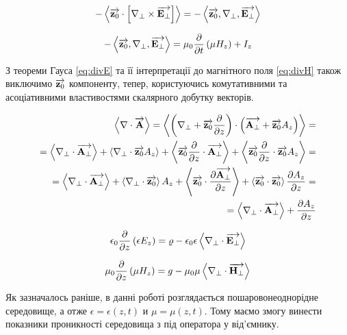 \textcolor{lightgray}{ \begin{equation*} \begin{aligned}
- \left< \overrightarrow{\mathbf z_0} \cdot \left[ \nabla_\perp \times \overrightarrow{\mathbf E_\perp} \right] \right> = 
- \left< \overrightarrow{\mathbf z_0} , \nabla_\perp , \overrightarrow{\mathbf E_\perp} \right>
\end{aligned} \end{equation*} }

\begin{equation} \label{eq:rotEz}
- \left< \overrightarrow{\mathbf z_0} , \nabla_\perp , \overrightarrow{\mathbf E_\perp} \right> =
\mu_0 \frac{\partial }{\partial t} \left(\mu H_z \right) + I_z
\end{equation}

З теореми Гауса \eqref{eq:divE} та її інтерпретації до магнітного поля 
\eqref{eq:divH} також виключимо $ \overrightarrow{\mathbf z_0} $ компоненту, тепер, користуючись 
комутативними та асоціативними властивостями скалярного добутку векторів.

\textcolor{lightgray}{ \begin{equation*} \begin{aligned}
\left< \nabla \cdot \overrightarrow{\mathbf A} \right> = \left< \left( \nabla_\perp + \overrightarrow{\mathbf z_0} \frac{\partial }{\partial z} \right) \cdot \left( \overrightarrow{\mathbf A_\perp} + \overrightarrow{\mathbf z_0} A_z \right) \right> = \\
= \left< \nabla_\perp \cdot \overrightarrow{\mathbf A_\perp} \right> + 
\left< \nabla_\perp \cdot \overrightarrow{\mathbf z_0} A_z \right>  +
\left< \overrightarrow{\mathbf z_0} \frac{\partial }{\partial z} \cdot \overrightarrow{\mathbf A_\perp} \right> +
\left< \overrightarrow{\mathbf z_0} \frac{\partial }{\partial z} \cdot \overrightarrow{\mathbf z_0} A_z \right> = \\
= \left< \nabla_\perp \cdot \overrightarrow{\mathbf A_\perp} \right> +
\left< \nabla_\perp \cdot \overrightarrow{\mathbf z_0} \right> A_z +
\left< \overrightarrow{\mathbf z_0} \cdot \frac{\partial \overrightarrow{\mathbf A_\perp}}{\partial z} \right> +
\left< \overrightarrow{\mathbf z_0} \cdot \overrightarrow{\mathbf z_0} \right> \frac{\partial A_z}{\partial z} = \\
= \left< \nabla_\perp \cdot \overrightarrow{\mathbf A_\perp} \right> + \frac{\partial A_z}{\partial z}
\end{aligned} \end{equation*} }

\begin{equation} \label{eq:divEt} 
\epsilon_0 \frac{\partial }{\partial z} \left( \epsilon E_z \right) = 
\varrho - \epsilon_0 \epsilon \left< \nabla_\perp \cdot \overrightarrow{\mathbf E_\perp} \right>
\end{equation}

\begin{equation} \label{eq:divHt}
\mu_0 \frac{\partial }{\partial z} \left( \mu H_z \right) = 
g - \mu_0 \mu \left< \nabla_\perp \cdot \overrightarrow{\mathbf H_\perp} \right>
\end{equation}

Як зазначалось раніше, в данні роботі розглядається пошаровонеоднорідне 
середовище, а отже $ \epsilon = \epsilon(z,t) $ и $ \mu = \mu(z,t) $. Тому
маємо змогу винести показники проникності середовища з під оператора у 
від'ємнику.

